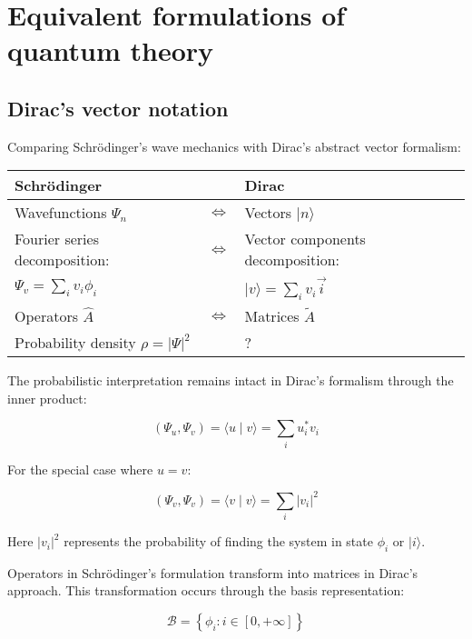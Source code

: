 \documentclass[italian]{HKNdocument}
\begin{document}
\section{Equivalent formulations of quantum theory}
\subsection{Dirac's vector notation}

Comparing Schrödinger's wave mechanics with Dirac's abstract vector formalism:

\begin{center}
\begin{tabular}{|l|l|l|}
\hline
Schrödinger &  & Dirac \\
\hline
Wavefunctions $\Psi_{n}$ & $\Longleftrightarrow$ & Vectors $|n\rangle$ \\
\hline
Fourier series decomposition: & $\Longleftrightarrow$ & Vector components decomposition: \\
\hline
$\Psi_{v}=\sum_{i} v_{i} \phi_{i}$ &  & $|v\rangle=\sum_{i} v_{i} \vec{i}$ \\
\hline
Operators $\hat{A}$ & $\Longleftrightarrow$ & Matrices $\tilde{A}$ \\
\hline
Probability density $\rho=|\Psi|^{2}$ &  & ? \\
\hline
\end{tabular}
\end{center}

The probabilistic interpretation remains intact in Dirac's formalism through the inner product:

\begin{equation}
\left(\Psi_{u}, \Psi_{v}\right)=\langle u \mid v\rangle=\sum_{i} u_{i}^{*} v_{i} \label{eq:10.1}
\end{equation}

For the special case where $u=v$:

\begin{equation}
\left(\Psi_{v}, \Psi_{v}\right)=\langle v \mid v\rangle=\sum_{i}\left|v_{i}\right|^{2} \label{eq:10.2}
\end{equation}

Here $\left|v_{i}\right|^{2}$ represents the probability of finding the system in state $\phi_{i}$ or $|i\rangle$.

Operators in Schrödinger's formulation transform into matrices in Dirac's approach. This transformation occurs through the basis representation:

\begin{equation}
\mathcal{B}=\left\{\phi_{i}: i \in[0,+\infty]\right\} \label{eq:10.3}
\end{equation}
\end{document}
